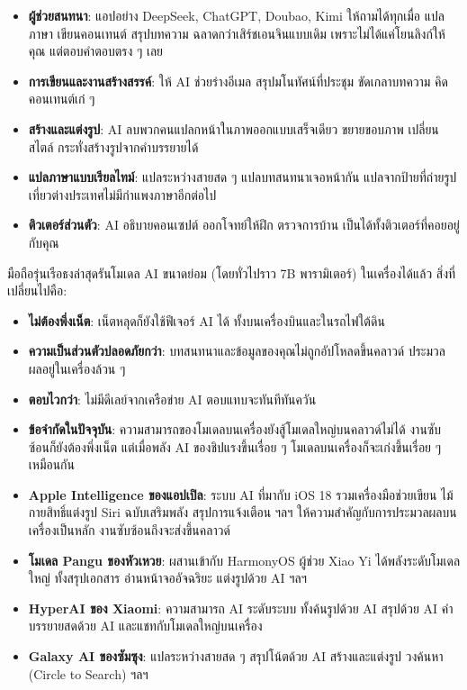 
\begin{itemize}
  \item \textbf{ผู้ช่วยสนทนา}: แอปอย่าง DeepSeek, ChatGPT, Doubao, Kimi ให้ถามได้ทุกเมื่อ แปลภาษา เขียนคอนเทนต์ สรุปบทความ ฉลาดกว่าเสิร์ชเอนจินแบบเดิม เพราะไม่ได้แค่โยนลิงก์ให้คุณ แต่ตอบคำตอบตรง ๆ เลย
  \item \textbf{การเขียนและงานสร้างสรรค์}: ให้ AI ช่วยร่างอีเมล สรุปมโนทัศน์ที่ประชุม ขัดเกลาบทความ คิดคอนเทนต์เก๋ ๆ
  \item \textbf{สร้างและแต่งรูป}: AI ลบพวกคนแปลกหน้าในภาพออกแบบเสร็จเดียว ขยายขอบภาพ เปลี่ยนสไตล์ กระทั่งสร้างรูปจากคำบรรยายได้
  \item \textbf{แปลภาษาแบบเรียลไทม์}: แปลระหว่างสายสด ๆ แปลบทสนทนาเจอหน้ากัน แปลจากป้ายที่ถ่ายรูป เที่ยวต่างประเทศไม่มีกำแพงภาษาอีกต่อไป
  \item \textbf{ติวเตอร์ส่วนตัว}: AI อธิบายคอนเซปต์ ออกโจทย์ให้ฝึก ตรวจการบ้าน เป็นได้ทั้งติวเตอร์ที่คอยอยู่กับคุณ
\end{itemize}


มือถือรุ่นเรือธงล่าสุดรันโมเดล AI ขนาดย่อม (โดยทั่วไปราว 7B พารามิเตอร์) ในเครื่องได้แล้ว สิ่งที่เปลี่ยนไปคือ:

\begin{itemize}
  \item \textbf{ไม่ต้องพึ่งเน็ต}: เน็ตหลุดก็ยังใช้ฟีเจอร์ AI ได้ ทั้งบนเครื่องบินและในรถไฟใต้ดิน
  \item \textbf{ความเป็นส่วนตัวปลอดภัยกว่า}: บทสนทนาและข้อมูลของคุณไม่ถูกอัปโหลดขึ้นคลาวด์ ประมวลผลอยู่ในเครื่องล้วน ๆ
  \item \textbf{ตอบไวกว่า}: ไม่มีดีเลย์จากเครือข่าย AI ตอบแทบจะทันทีทันควัน
  \item \textbf{ข้อจำกัดในปัจจุบัน}: ความสามารถของโมเดลบนเครื่องยังสู้โมเดลใหญ่บนคลาวด์ไม่ได้ งานซับซ้อนก็ยังต้องพึ่งเน็ต แต่เมื่อพลัง AI ของชิปแรงขึ้นเรื่อย ๆ โมเดลบนเครื่องก็จะเก่งขึ้นเรื่อย ๆ เหมือนกัน
\end{itemize}


\begin{itemize}
  \item \textbf{Apple Intelligence ของแอปเปิล}: ระบบ AI ที่มากับ iOS 18 รวมเครื่องมือช่วยเขียน ไม้กายสิทธิ์แต่งรูป Siri ฉบับเสริมพลัง สรุปการแจ้งเตือน ฯลฯ ให้ความสำคัญกับการประมวลผลบนเครื่องเป็นหลัก งานซับซ้อนถึงจะส่งขึ้นคลาวด์
  \item \textbf{โมเดล Pangu ของหัวเหวย}: ผสานเข้ากับ HarmonyOS ผู้ช่วย Xiao Yi ได้พลังระดับโมเดลใหญ่ ทั้งสรุปเอกสาร อ่านหน้าจออัจฉริยะ แต่งรูปด้วย AI ฯลฯ
  \item \textbf{HyperAI ของ Xiaomi}: ความสามารถ AI ระดับระบบ ทั้งค้นรูปด้วย AI สรุปด้วย AI คำบรรยายสดด้วย AI และแชทกับโมเดลใหญ่บนเครื่อง
  \item \textbf{Galaxy AI ของซัมซุง}: แปลระหว่างสายสด ๆ สรุปโน้ตด้วย AI สร้างและแต่งรูป วงค้นหา (Circle to Search) ฯลฯ
\end{itemize}

